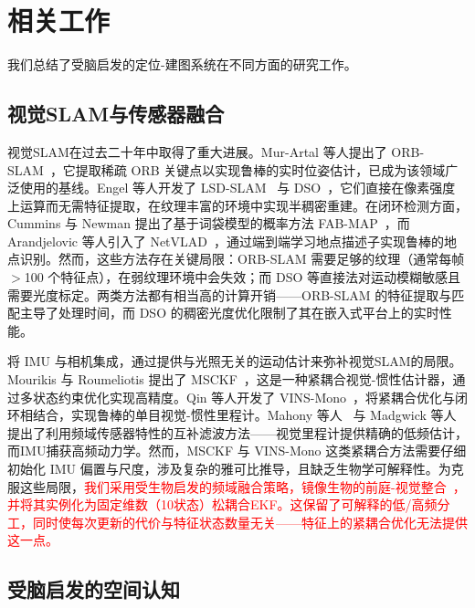 \section{相关工作}
\label{sec:related}

我们总结了受脑启发的定位-建图系统在不同方面的研究工作。

\subsection{视觉SLAM与传感器融合}
\label{sec:related_slam}

视觉SLAM在过去二十年中取得了重大进展。Mur-Artal 等人提出了 ORB-SLAM~\cite{mur2015orb}，它提取稀疏 ORB 关键点以实现鲁棒的实时位姿估计，已成为该领域广泛使用的基线。Engel 等人开发了 LSD-SLAM~\cite{engel2014lsd} 与 DSO~\cite{engel2018direct}，它们直接在像素强度上运算而无需特征提取，在纹理丰富的环境中实现半稠密重建。在闭环检测方面，Cummins 与 Newman 提出了基于词袋模型的概率方法 FAB-MAP~\cite{Cummins2008}，而 Arandjelovic 等人引入了 NetVLAD~\cite{Arandjelovic2016}，通过端到端学习地点描述子实现鲁棒的地点识别。然而，这些方法存在关键局限：ORB-SLAM 需要足够的纹理（通常每帧 $>$100 个特征点），在弱纹理环境中会失效；而 DSO 等直接法对运动模糊敏感且需要光度标定。两类方法都有相当高的计算开销——ORB-SLAM 的特征提取与匹配主导了处理时间，而 DSO 的稠密光度优化限制了其在嵌入式平台上的实时性能。

将 IMU 与相机集成，通过提供与光照无关的运动估计来弥补视觉SLAM的局限。Mourikis 与 Roumeliotis 提出了 MSCKF~\cite{Mourikis2007}，这是一种紧耦合视觉-惯性估计器，通过多状态约束优化实现高精度。Qin 等人开发了 VINS-Mono~\cite{Qin2018}，将紧耦合优化与闭环相结合，实现鲁棒的单目视觉-惯性里程计。Mahony 等人~\cite{Mahony2008} 与 Madgwick 等人~\cite{Madgwick2011} 提出了利用频域传感器特性的互补滤波方法——视觉里程计提供精确的低频估计，而IMU捕获高频动力学。然而，MSCKF 与 VINS-Mono 这类紧耦合方法需要仔细初始化 IMU 偏置与尺度，涉及复杂的雅可比推导，且缺乏生物学可解释性。为克服这些局限，\textcolor{red}{我们采用受生物启发的频域融合策略，镜像生物的前庭-视觉整合~\cite{Angelaki2004, Cullen2012}，并将其实例化为固定维数（10状态）松耦合EKF。这保留了可解释的低/高频分工，同时使每次更新的代价与特征状态数量无关——特征上的紧耦合优化无法提供这一点。}

\subsection{受脑启发的空间认知}
\label{sec:related_bio}

